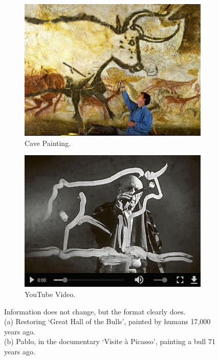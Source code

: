 \begin{figure}[!tbp]
  \begin{subfigure}[b]{0.49\textwidth}
    \includegraphics[width=\textwidth]{graphics/bull_cave.jpg}
    \caption{Cave Painting.}
    \label{fig:cave}
  \end{subfigure}
  \hfill
  \begin{subfigure}[b]{0.49\textwidth}
    \includegraphics[width=\textwidth]{graphics/bull_picasso.jpg}
    \caption{YouTube Video.}
    \label{fig:picasso}
  \end{subfigure}
  \caption{Information does not change, but the format clearly does.
  \\(a) Restoring `Great Hall of the Bulls', painted by humans 17,000 years ago.
  \\(b) Pablo, in the documentary `Visite à Picasso', painting a bull 71 years ago.}%
  \label{fig:bull}
\end{figure}

